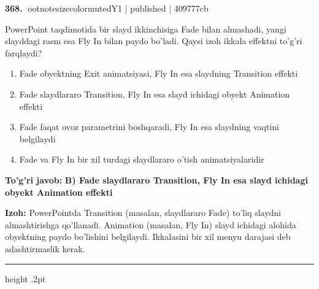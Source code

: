 \documentclass[10pt,a4paper]{article}
\begin{document}
\textbf{\color{ink}368.} {ootnotesizecolor{muted}Y1 | published | 409777cb}
\par
PowerPoint taqdimotida bir slayd ikkinchisiga Fade bilan almashadi, yangi slayddagi rasm esa Fly In bilan paydo bo'ladi. Qaysi izoh ikkala effektni to'g'ri farqlaydi?
\begin{enumerate}[label=\Alph*),leftmargin=9mm]
\item Fade obyektning Exit animatsiyasi, Fly In esa slaydning Transition effekti
\item Fade slaydlararo Transition, Fly In esa slayd ichidagi obyekt Animation effekti
\item Fade faqat ovoz parametrini boshqaradi, Fly In esa slaydning vaqtini belgilaydi
\item Fade va Fly In bir xil turdagi slaydlararo o'tish animatsiyalaridir
\end{enumerate}
\begin{tcolorbox}[enhanced,breakable,colback=teal!4,colframe=teal!55!black,boxrule=0.45pt,arc=1.2mm,left=2.8mm,right=2.8mm,top=2mm,bottom=2mm]
\textbf{\color{teal}To'g'ri javob:} \textbf{B) Fade slaydlararo Transition, Fly In esa slayd ichidagi obyekt Animation effekti}
\par\smallskip
\textbf{Izoh:} PowerPointda Transition (masalan, slaydlararo Fade) to'liq slaydni almashtirishga qo'llanadi. Animation (masalan, Fly In) slayd ichidagi alohida obyektning paydo bo'lishini belgilaydi. Ikkalasini bir xil menyu darajasi deb adashtirmaslik kerak.
\end{tcolorbox}
\vspace{2mm}\hrule height .2pt\vspace{2mm}
\end{document}
